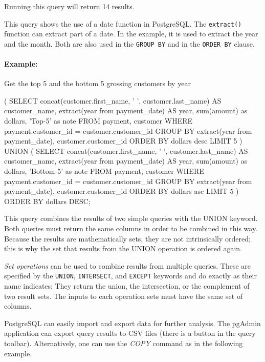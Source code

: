 Running this query will return 14 results.

This query shows the use of a date function in PostgreSQL. The \texttt{extract()} function can extract part of a date. In the example, it is used to extract the year and the month. Both are also used in the \texttt{GROUP BY} and in the \texttt{ORDER BY} clause. 

\paragraph*{Example:} Get the top 5 and the bottom 5 grossing customers by year


\begin{sqlcode}
( SELECT concat(customer.first_name, ' ', 
                customer.last_name) AS customer_name,
       extract(year from payment_date) AS year, 
       sum(amount) as dollars,
       'Top-5' as note
FROM payment, customer
WHERE payment.customer_id = customer.customer_id
GROUP BY extract(year from payment_date),
         customer.customer_id
ORDER BY dollars desc
LIMIT 5
) UNION (
SELECT concat(customer.first_name, ' ', 
              customer.last_name) AS customer_name,
       extract(year from payment_date) AS year, 
       sum(amount) as dollars,
       'Bottom-5' as note
FROM payment, customer
WHERE payment.customer_id = customer.customer_id
GROUP BY extract(year from payment_date),
         customer.customer_id
ORDER BY dollars asc
LIMIT 5 ) ORDER BY dollars DESC;
\end{sqlcode}

This query combines the results of two simple queries with the UNION keyword. Both queries must return the same columns in order to be combined in this way. Because the results are mathematically sets, they are not intrinsically ordered; this is why the set that results from the UNION operation is ordered again.

\emph{Set operations} can be used to combine results from multiple queries. These are specified by the \texttt{UNION}, \texttt{INTERSECT}, and \texttt{EXCEPT} keywords and do exactly as their name indicates: They return the union, the intersection, or the complement of two result sets. The inputs to each operation sets must have the same set of columns.

PostgreSQL can easily import and export data for further analysis. The pgAdmin application can export query results to CSV files (there is a button in the query toolbar). Alternatively, one can use the \emph{COPY} command as in the following example.

